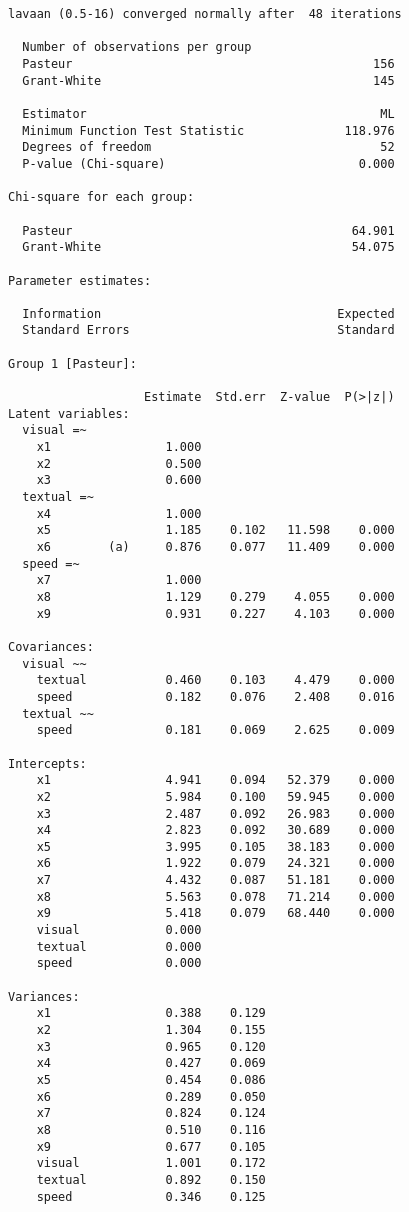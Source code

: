 \begin{verbatim}
lavaan (0.5-16) converged normally after  48 iterations

  Number of observations per group         
  Pasteur                                          156
  Grant-White                                      145

  Estimator                                         ML
  Minimum Function Test Statistic              118.976
  Degrees of freedom                                52
  P-value (Chi-square)                           0.000

Chi-square for each group:

  Pasteur                                       64.901
  Grant-White                                   54.075

Parameter estimates:

  Information                                 Expected
  Standard Errors                             Standard

Group 1 [Pasteur]:

                   Estimate  Std.err  Z-value  P(>|z|)
Latent variables:
  visual =~
    x1                1.000
    x2                0.500
    x3                0.600
  textual =~
    x4                1.000
    x5                1.185    0.102   11.598    0.000
    x6        (a)     0.876    0.077   11.409    0.000
  speed =~
    x7                1.000
    x8                1.129    0.279    4.055    0.000
    x9                0.931    0.227    4.103    0.000

Covariances:
  visual ~~
    textual           0.460    0.103    4.479    0.000
    speed             0.182    0.076    2.408    0.016
  textual ~~
    speed             0.181    0.069    2.625    0.009

Intercepts:
    x1                4.941    0.094   52.379    0.000
    x2                5.984    0.100   59.945    0.000
    x3                2.487    0.092   26.983    0.000
    x4                2.823    0.092   30.689    0.000
    x5                3.995    0.105   38.183    0.000
    x6                1.922    0.079   24.321    0.000
    x7                4.432    0.087   51.181    0.000
    x8                5.563    0.078   71.214    0.000
    x9                5.418    0.079   68.440    0.000
    visual            0.000
    textual           0.000
    speed             0.000

Variances:
    x1                0.388    0.129
    x2                1.304    0.155
    x3                0.965    0.120
    x4                0.427    0.069
    x5                0.454    0.086
    x6                0.289    0.050
    x7                0.824    0.124
    x8                0.510    0.116
    x9                0.677    0.105
    visual            1.001    0.172
    textual           0.892    0.150
    speed             0.346    0.125




\end{verbatim}
